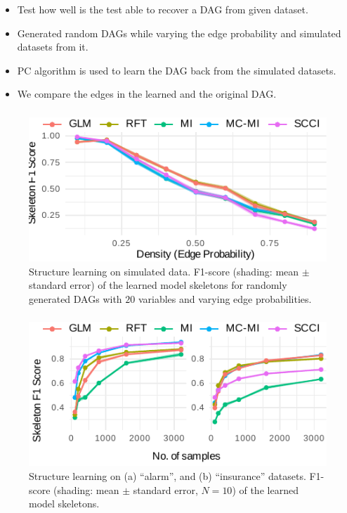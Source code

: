 \documentclass{beamer}
\begin{document}
\begin{frame}
	\frametitle{}
	\begin{itemize}
		\item Test how well is the test able to recover a DAG from given dataset.
		\item Generated random DAGs while varying the edge probability and simulated datasets from it.
		\item PC algorithm is used to learn the DAG back from the simulated datasets.
		\item We compare the edges in the learned and the original DAG.
	\end{itemize}
\end{frame}

\begin{frame}
	\frametitle{}
	\begin{figure}
		\centering
		\includegraphics{imgs/sl_density.pdf}
		\caption*{Structure learning on simulated data. F1-score
		(shading: mean $\pm$ standard error) of the learned model
		skeletons for randomly generated DAGs with $20$ variables and
		varying edge probabilities.}
	\end{figure}
\end{frame}

\begin{frame}
	\frametitle{}
	\begin{figure}
		\centering
		\includegraphics{imgs/sl.pdf}
		\caption*{Structure learning on (a) ``alarm'', and (b)
		``insurance'' datasets.  F1-score (shading: mean $\pm$ standard
		error, $N=10$) of the learned model skeletons.}
	\end{figure}
\end{frame}
\end{document}
